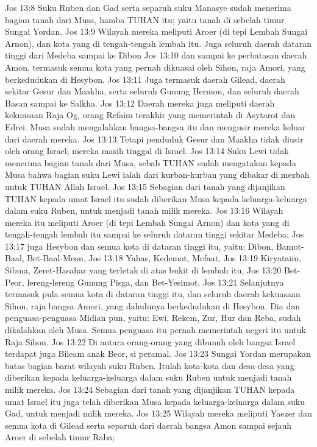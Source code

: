Jos 13:8  Suku Ruben dan Gad serta separuh suku Manasye sudah menerima bagian tanah dari Musa, hamba TUHAN itu; yaitu tanah di sebelah timur Sungai Yordan.
Jos 13:9  Wilayah mereka meliputi Aroer (di tepi Lembah Sungai Arnon), dan kota yang di tengah-tengah lembah itu. Juga seluruh daerah dataran tinggi dari Medeba sampai ke Dibon
Jos 13:10  dan sampai ke perbatasan daerah Amon, termasuk semua kota yang pernah dikuasai oleh Sihon, raja Amori, yang berkedudukan di Hesybon.
Jos 13:11  Juga termasuk daerah Gilead, daerah sekitar Gesur dan Maakha, serta seluruh Gunung Hermon, dan seluruh daerah Basan sampai ke Salkha.
Jos 13:12  Daerah mereka juga meliputi daerah kekuasaan Raja Og, orang Refaim terakhir yang memerintah di Asytarot dan Edrei. Musa sudah mengalahkan bangsa-bangsa itu dan mengusir mereka keluar dari daerah mereka.
Jos 13:13  Tetapi penduduk Gesur dan Maakha tidak diusir oleh orang Israel; mereka masih tinggal di Israel.
Jos 13:14  Suku Lewi tidak menerima bagian tanah dari Musa, sebab TUHAN sudah mengatakan kepada Musa bahwa bagian suku Lewi ialah dari kurban-kurban yang dibakar di mezbah untuk TUHAN Allah Israel.
Jos 13:15  Sebagian dari tanah yang dijanjikan TUHAN kepada umat Israel itu sudah diberikan Musa kepada keluarga-keluarga dalam suku Ruben, untuk menjadi tanah milik mereka.
Jos 13:16  Wilayah mereka itu meliputi Aroer (di tepi Lembah Sungai Arnon) dan kota yang di tengah-tengah lembah itu sampai ke seluruh dataran tinggi sekitar Medeba;
Jos 13:17  juga Hesybon dan semua kota di dataran tinggi itu, yaitu: Dibon, Bamot-Baal, Bet-Baal-Meon,
Jos 13:18  Yahas, Kedemot, Mefaat,
Jos 13:19  Kiryataim, Sibma, Zeret-Hasahar yang terletak di atas bukit di lembah itu,
Jos 13:20  Bet-Peor, lereng-lereng Gunung Pisga, dan Bet-Yesimot.
Jos 13:21  Selanjutnya termasuk pula semua kota di dataran tinggi itu, dan seluruh daerah kekuasaan Sihon, raja bangsa Amori, yang dahulunya berkedudukan di Hesybon. Dia dan penguasa-penguasa Midian pun, yaitu: Ewi, Rekem, Zur, Hur dan Reba, sudah dikalahkan oleh Musa. Semua penguasa itu pernah memerintah negeri itu untuk Raja Sihon.
Jos 13:22  Di antara orang-orang yang dibunuh oleh bangsa Israel terdapat juga Bileam anak Beor, si peramal.
Jos 13:23  Sungai Yordan merupakan batas bagian barat wilayah suku Ruben. Itulah kota-kota dan desa-desa yang diberikan kepada keluarga-keluarga dalam suku Ruben untuk menjadi tanah milik mereka.
Jos 13:24  Sebagian dari tanah yang dijanjikan TUHAN kepada umat Israel itu juga telah diberikan Musa kepada keluarga-keluarga dalam suku Gad, untuk menjadi milik mereka.
Jos 13:25  Wilayah mereka meliputi Yaezer dan semua kota di Gilead serta separuh dari daerah bangsa Amon sampai sejauh Aroer di sebelah timur Raba;
